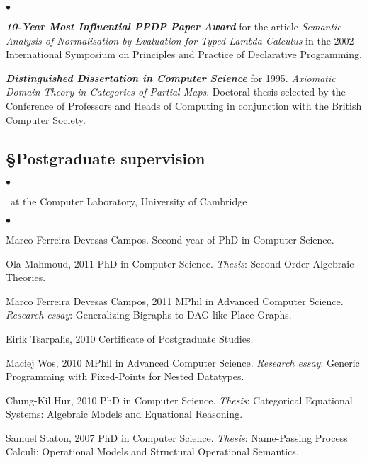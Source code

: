 \documentclass[11pt,twocolumn]{article}
\newenvironment{myitemize}
  {\begin{list}{$\bullet$}
  {\setlength{\topsep}{1pt}
   \setlength{\partopsep}{1pt}
   \setlength{\itemsep}{0pt}
   \setlength{\parsep}{0pt}
   \setlength{\leftmargin}{1em}
   \setlength{\labelwidth}{.5em}}}
  {\end{list}}
\begin{document}
\begin{myitemize}
\item
\textbf{\em 10-Year Most Influential PPDP Paper Award} for the article
\emph{Semantic Analysis of Normalisation by Evaluation for Typed Lambda
Calculus} in the 2002 International Symposium on Principles and Practice
of Declarative Programming.

\item
\textbf{\em Distinguished Dissertation in Computer Science} for 1995.
\emph{Axiomatic Domain Theory in Categories of Partial Maps}.  Doctoral
thesis selected by the Conference of Professors and Heads of Computing in
conjunction with the British Computer Society.
\end{myitemize}

\subsection*{\S\enspace\thinspace Postgraduate supervision}
\vspace*{-1.9mm}
\begin{myitemize}
\item[]\small\ at the Computer Laboratory, University of Cambridge
\end{myitemize}

\begin{myitemize}
\item
  Marco Ferreira Devesas Campos.  Second year of PhD in Computer Science.

\item
  Ola Mahmoud, 2011 PhD in Computer Science.  \emph{Thesis}: Second-Order
  Algebraic Theories.

\item
  Marco Ferreira Devesas Campos, 2011 MPhil in Advanced Computer Science.
  \emph{Research essay}: Generalizing Bigraphs to DAG-like Place Graphs.

\item
  Eirik Tsarpalis, 2010 Certificate of Postgraduate Studies.

\item
  Maciej Wos, 2010 MPhil in Advanced Computer Science. \emph{Research essay}:
  Generic Programming with Fixed-Points for Nested Datatypes.

\item
  Chung-Kil Hur, 2010 PhD in Computer Science.  \emph{Thesis}: Categorical
  Equational Systems: Algebraic Models and Equational Reasoning.

\item
  Samuel Staton, 2007 PhD in Computer Science.  \emph{Thesis}:
  Name-Passing Process Calculi: Operational Models and Structural
  Operational Semantics.
\end{myitemize}
\end{document}
